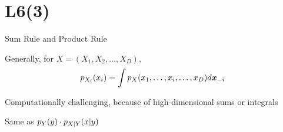\documentclass[handout,fleqn,aspectratio=169]{beamer}
\begin{document}





\section{L6(3)}
\begin{frame}{Sum Rule and Product Rule}

\plitemsep 0.1in
\bci
\item {}

\bci
\item Generally, for $X = (X_1, X_2, \ldots, X_D),$
$$p_{X_i}(x_i) = \int p_{X}(x_1, \ldots, x_i, \ldots, x_D) d\bm{x}_{-i}$$  
\item Computationally challenging, because of high-dimensional sums or integrals
\eci

\item {}
\vspace{-0.6cm}
\bci
\item Same as $p_Y(y) \cdot p_{X|Y}(x|y)$
\eci

\eci
\end{frame}
\end{document}
